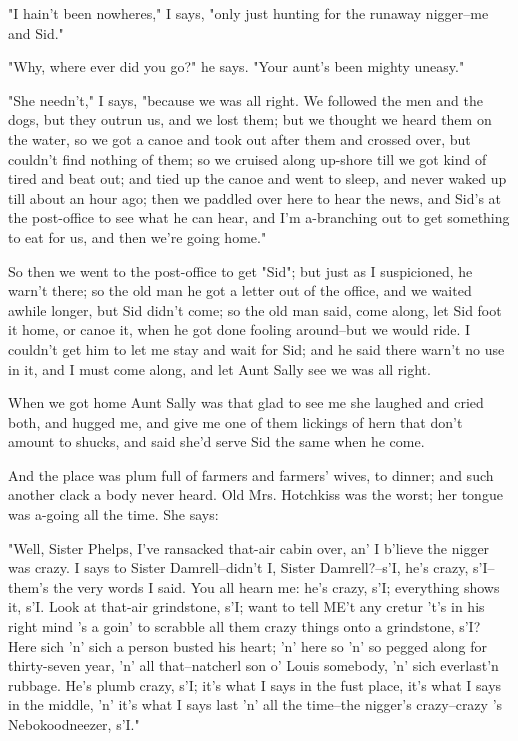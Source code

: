 "I hain't been nowheres," I says, "only just hunting for the runaway
nigger--me and Sid."

"Why, where ever did you go?" he says.  "Your aunt's been mighty uneasy."

"She needn't," I says, "because we was all right.  We followed the men
and the dogs, but they outrun us, and we lost them; but we thought we
heard them on the water, so we got a canoe and took out after them and
crossed over, but couldn't find nothing of them; so we cruised along
up-shore till we got kind of tired and beat out; and tied up the canoe
and went to sleep, and never waked up till about an hour ago; then we
paddled over here to hear the news, and Sid's at the post-office to see
what he can hear, and I'm a-branching out to get something to eat for us,
and then we're going home."

So then we went to the post-office to get "Sid"; but just as I
suspicioned, he warn't there; so the old man he got a letter out of the
office, and we waited awhile longer, but Sid didn't come; so the old man
said, come along, let Sid foot it home, or canoe it, when he got done
fooling around--but we would ride.  I couldn't get him to let me stay and
wait for Sid; and he said there warn't no use in it, and I must come
along, and let Aunt Sally see we was all right.

When we got home Aunt Sally was that glad to see me she laughed and cried
both, and hugged me, and give me one of them lickings of hern that don't
amount to shucks, and said she'd serve Sid the same when he come.

And the place was plum full of farmers and farmers' wives, to dinner; and
such another clack a body never heard.  Old Mrs. Hotchkiss was the worst;
her tongue was a-going all the time.  She says:

"Well, Sister Phelps, I've ransacked that-air cabin over, an' I b'lieve
the nigger was crazy.  I says to Sister Damrell--didn't I, Sister
Damrell?--s'I, he's crazy, s'I--them's the very words I said.  You all
hearn me: he's crazy, s'I; everything shows it, s'I.  Look at that-air
grindstone, s'I; want to tell ME't any cretur 't's in his right mind 's a
goin' to scrabble all them crazy things onto a grindstone, s'I?  Here
sich 'n' sich a person busted his heart; 'n' here so 'n' so pegged along
for thirty-seven year, 'n' all that--natcherl son o' Louis somebody, 'n'
sich everlast'n rubbage.  He's plumb crazy, s'I; it's what I says in the
fust place, it's what I says in the middle, 'n' it's what I says last 'n'
all the time--the nigger's crazy--crazy 's Nebokoodneezer, s'I."

